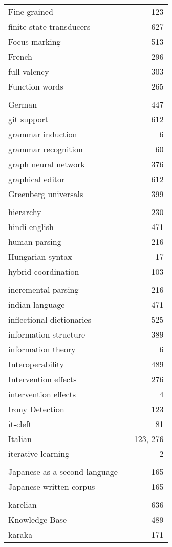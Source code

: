 \documentclass{easychair}
\begin{document}
\begin{longtable}{lp{7em}r}
Fine-grained & & 123 
\\
finite-state transducers & & 627 
\\
Focus marking & & 513 
\\
French & & 296 
\\
full valency & & 303 
\\
Function words & & 265 
\\
\\
German & & 447 
\\
git support & & 612 
\\
grammar induction & & 6 
\\
grammar recognition & & 60 
\\
graph neural network & & 376 
\\
graphical editor & & 612 
\\
Greenberg universals & & 399 
\\
\\
hierarchy & & 230 
\\
hindi english & & 471 
\\
human parsing & & 216 
\\
Hungarian syntax & & 17 
\\
hybrid coordination & & 103 
\\
\\
incremental parsing & & 216 
\\
indian language & & 471 
\\
inflectional dictionaries & & 525 
\\
information structure & & 389 
\\
information theory & & 6 
\\
Interoperability & & 489 
\\
Intervention effects & & 276 
\\
intervention effects & & 4 
\\
Irony Detection & & 123 
\\
it-cleft & & 81 
\\
Italian & & 123, 276 
\\
iterative learning & & 2 
\\
\\
Japanese as a second language & & 165 
\\
Japanese written corpus & & 165 
\\
\\
karelian & & 636 
\\
Knowledge Base & & 489 
\\
k\={a}raka & & 171 
\\

\end{longtable}
\end{document}
